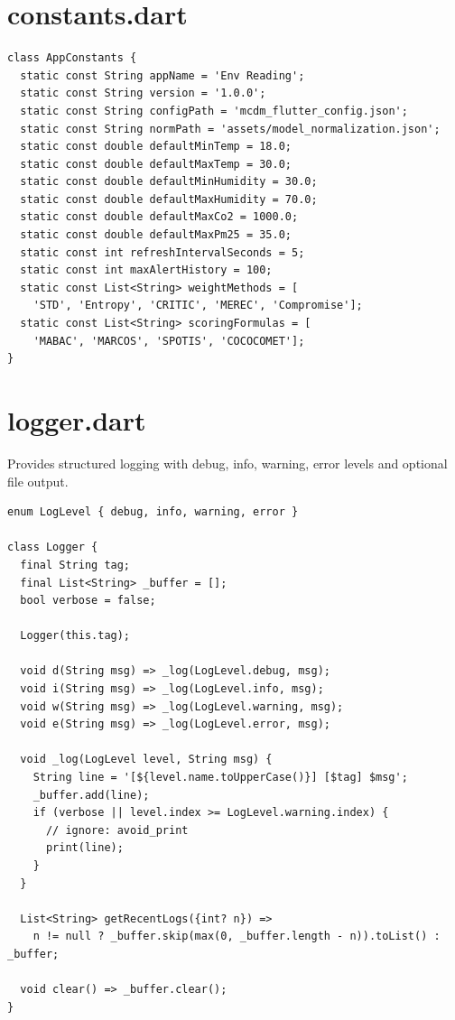 \documentclass[12pt,a4paper,oneside]{report}
\begin{document}
\section{constants.dart}

\begin{lstlisting}[style=dartstyle]
class AppConstants {
  static const String appName = 'Env Reading';
  static const String version = '1.0.0';
  static const String configPath = 'mcdm_flutter_config.json';
  static const String normPath = 'assets/model_normalization.json';
  static const double defaultMinTemp = 18.0;
  static const double defaultMaxTemp = 30.0;
  static const double defaultMinHumidity = 30.0;
  static const double defaultMaxHumidity = 70.0;
  static const double defaultMaxCo2 = 1000.0;
  static const double defaultMaxPm25 = 35.0;
  static const int refreshIntervalSeconds = 5;
  static const int maxAlertHistory = 100;
  static const List<String> weightMethods = [
    'STD', 'Entropy', 'CRITIC', 'MEREC', 'Compromise'];
  static const List<String> scoringFormulas = [
    'MABAC', 'MARCOS', 'SPOTIS', 'COCOCOMET'];
}
\end{lstlisting}

\section{logger.dart}

Provides structured logging with debug, info, warning, error levels and optional file output.

\begin{lstlisting}[style=dartstyle]
enum LogLevel { debug, info, warning, error }

class Logger {
  final String tag;
  final List<String> _buffer = [];
  bool verbose = false;

  Logger(this.tag);

  void d(String msg) => _log(LogLevel.debug, msg);
  void i(String msg) => _log(LogLevel.info, msg);
  void w(String msg) => _log(LogLevel.warning, msg);
  void e(String msg) => _log(LogLevel.error, msg);

  void _log(LogLevel level, String msg) {
    String line = '[${level.name.toUpperCase()}] [$tag] $msg';
    _buffer.add(line);
    if (verbose || level.index >= LogLevel.warning.index) {
      // ignore: avoid_print
      print(line);
    }
  }

  List<String> getRecentLogs({int? n}) =>
    n != null ? _buffer.skip(max(0, _buffer.length - n)).toList() : _buffer;

  void clear() => _buffer.clear();
}
\end{lstlisting}
\end{document}
